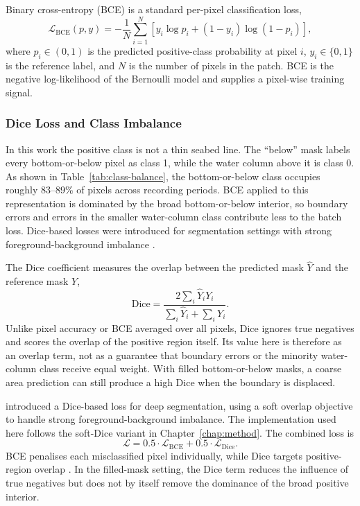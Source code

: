 Binary cross-entropy (BCE) is a standard per-pixel classification loss,
\begin{equation}
    \mathcal{L}_\text{BCE}(p, y) = -\frac{1}{N}\sum_{i=1}^{N} \left[ y_i \log p_i + (1 - y_i) \log(1 - p_i) \right],
\end{equation}
where $p_i \in (0,1)$ is the predicted positive-class probability at pixel $i$, $y_i \in \{0,1\}$ is the reference label, and $N$ is the number of pixels in the patch. BCE is the negative log-likelihood of the Bernoulli model and supplies a pixel-wise training signal.

\subsubsection{Dice Loss and Class Imbalance}

In this work the positive class is not a thin seabed line. The ``below'' mask labels every bottom-or-below pixel as class 1, while the water column above it is class 0. As shown in Table~\ref{tab:class-balance}, the bottom-or-below class occupies roughly 83--89\% of pixels across recording periods. BCE applied to this representation is dominated by the broad bottom-or-below interior, so boundary errors and errors in the smaller water-column class contribute less to the batch loss. Dice-based losses were introduced for segmentation settings with strong foreground-background imbalance \cite{milletari_vnet_2016,sudre_generalised_2017}.

The Dice coefficient measures the overlap between the predicted mask $\hat{Y}$ and the reference mask $Y$,
\begin{equation}
    \text{Dice} = \frac{2 \sum_{i} \hat{Y}_i Y_i}{\sum_{i} \hat{Y}_i + \sum_{i} Y_i}.
\end{equation}
Unlike pixel accuracy or BCE averaged over all pixels, Dice ignores true negatives and scores the overlap of the positive region itself. Its value here is therefore as an overlap term, not as a guarantee that boundary errors or the minority water-column class receive equal weight. With filled bottom-or-below masks, a coarse area prediction can still produce a high Dice when the boundary is displaced.

\textcite{milletari_vnet_2016} introduced a Dice-based loss for deep segmentation, using a soft overlap objective to handle strong foreground-background imbalance. The implementation used here follows the soft-Dice variant in Chapter~\ref{chap:method}. The combined loss is
\begin{equation}
    \mathcal{L} = 0.5 \cdot \mathcal{L}_\text{BCE} + 0.5 \cdot \mathcal{L}_\text{Dice}.
\end{equation}
BCE penalises each misclassified pixel individually, while Dice targets positive-region overlap \cite{sudre_generalised_2017}. In the filled-mask setting, the Dice term reduces the influence of true negatives but does not by itself remove the dominance of the broad positive interior.

